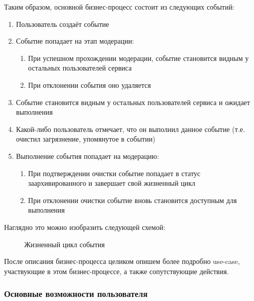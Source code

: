\documentclass[diploma]{SCWorks}
\begin{document}
Таким образом, основной бизнес-процесс состоит из следующих событий:
\begin{enumerate}
    \item Пользователь создаёт событие
    \item Событие попадает на этап модерации:
    \begin{enumerate}
        \item При успешном прохождении модерации, событие становится видным
        у остальных пользователей сервиса
        \item При отклонении события оно удаляется
    \end{enumerate}
    \item Событие становится видным у остальных пользователей сервиса и ожидает
    выполнения
    \item Какой-либо пользователь отмечает, что он выполнил данное событие (т.е.
    очистил загрязнение, упомянутое в событии)
    \item Выполнение события попадает на модерацию:
    \begin{enumerate}
        \item При подтверждении очистки событие попадает в статус 
        заархивированного и завершает свой жизненный цикл
        \item При отклонении очистки событие вновь становится доступным для 
        выполнения
    \end{enumerate}
\end{enumerate}

Наглядно это можно изобразить следующей схемой:

\begin{figure}[H]
	\caption{Жизненный цикл события}
	\label{pic:event_lifetime}
\end{figure}

После описания бизнес-процесса целиком опишем более подробно use-case, 
участвующие в этом бизнес-процессе, а также сопутствующие действия.

\subsubsection{Основные возможности пользователя}
\end{document}
